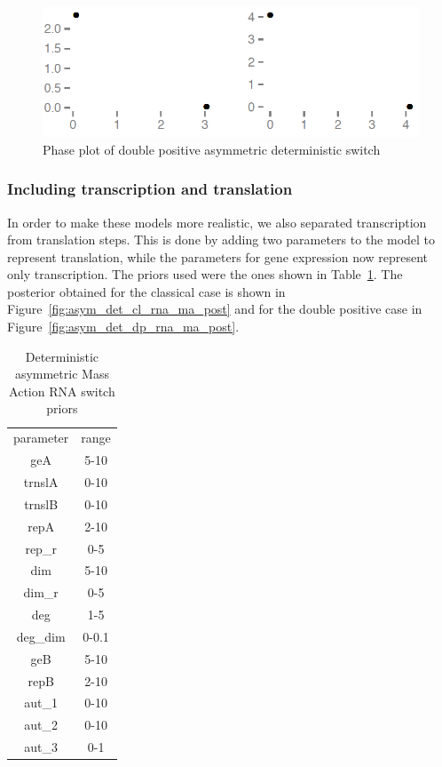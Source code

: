 \begin{figure}[htbp]
\begin{center}
\includegraphics[scale=0.2]{chapterModelling/mass_action_switches/deterministic/asym/dp_det_phase.png}
\caption{Phase plot of double positive asymmetric deterministic switch}\label{fig:asym_det_dp_ma_phase}
\end{center}
\end{figure}

\clearpage
\subsubsection{Including transcription and translation}
In order to make these models more realistic, we also separated transcription from translation steps. This is done by adding two parameters to the model to represent translation, while the parameters for gene expression now represent only transcription. The priors used were the ones shown in Table~\ref{tab:asym_cl_rna_det_ma}. The posterior obtained for the classical case is shown in Figure~\ref{fig:asym_det_cl_rna_ma_post} and for the double positive case in Figure~\ref{fig:asym_det_dp_rna_ma_post}.

\begin{table}[htbp]
\centering
\caption{Deterministic asymmetric Mass Action RNA switch priors}
\label{tab:asym_cl_rna_det_ma}
\begin{tabular}{cc}
parameter & range \\
geA & 5-10 \\
trnslA & 0-10 \\
trnslB & 0-10 \\
repA & 2-10 \\
rep\_r & 0-5 \\
dim & 5-10 \\
dim\_r & 0-5 \\
deg & 1-5 \\
deg\_dim & 0-0.1 \\
geB & 5-10 \\
repB & 2-10 \\
aut\_1 & 0-10\\
aut\_2 & 0-10\\
aut\_3 & 0-1\\
\end{tabular}
\end{table}

